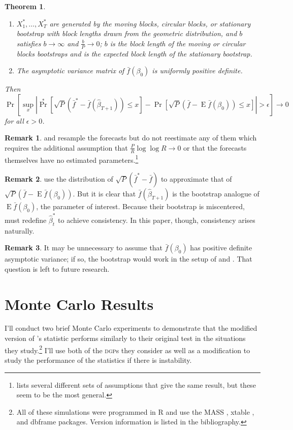 \documentclass[12pt,fleqn]{article}
\newcommand\citepos[2][]{\citeauthor{#2}'s \citeyearpar[#1]{#2}}
\newtheorem{thm}{Theorem}
\theoremstyle{definition}
\newtheorem{rem}{Remark}
\DeclareMathOperator{\E}{E}
\DeclareMathOperator{\pr}{Pr}
\newcommand{\dgp}{\textsc{dgp}}
\begin{document}
\begin{thm}
\begin{enumerate}
  \item $X_1^{*},\dots,X_T^{*}$ are generated by the moving blocks,
    circular blocks, or stationary bootstrap with block lengths drawn
    from the geometric distribution, and $b$ satisfies $b \to \infty$
    and $\frac{b}{P} \to 0$; $b$ is the block length of the moving or
    circular blocks bootstraps and is the expected block length of the
    stationary bootstrap.
  \item The asymptotic variance matrix of $\bar{f}(\beta_0)$ is
    uniformly positive definite.
  \end{enumerate}
  Then
  \begin{equation}
    \pr[\sup_x | \pr^*[\sqrt{P} (\bar{f}^* - \bar{f}(\hat{\beta}_{T+1}))
        \leq x] - \pr[\sqrt{P}( \bar{f} - \E \bar{f}(\beta_0)) \leq x] | >
      \epsilon] \to 0
  \end{equation}
  for all $\epsilon > 0$.
\end{thm}

\begin{rem}
  \citet{Whi:00} and \citet{Han:05} resample the forecasts but do not
  reestimate any of them which requires the additional assumption that
  $\tfrac{P}{R} \log \log R \to 0$ or that the forecasts themselves
  have no estimated parameters.\footnote{\citet{Whi:00} lists several
    different sets of assumptions that give the same result, but these
    seem to be the most general.}
\end{rem}

\begin{rem}
  \citet{CoS:07} use the distribution of $\sqrt{P}(\bar{f}^{*} -
  \bar{f})$ to approximate that of $\sqrt{P}(\bar{f} - \E
  \bar{f}(\beta_0))$.  But it is clear that
  $\bar{f}(\hat{\beta}_{T+1})$ is the bootstrap analogue of $\E
  \bar{f}(\beta_0)$, the parameter of interest.  Because their
  bootstrap is miscentered, \citet{CoS:07} must redefine
  $\hat{\beta}_t^{*}$ to achieve consistency.  In this paper, though,
  consistency arises naturally.
\end{rem}

\begin{rem}
  It may be unnecessary to assume that $\bar{f}(\beta_0)$ has positive
  definite asymptotic variance; if so, the bootstrap would work in the
  setup of \citet{ClM:05,ClM:01} and \citet{Mcc:07}.  That question is
  left to future research.
\end{rem}

\section{Monte Carlo Results}\label{sec:2}
I'll conduct two brief Monte Carlo experiments to demonstrate that the
modified version of \citepos{ClW:07} statistic performs similarly to
their original test in the situations they study.\footnote{All of
  these simulations were programmed in R \citep{R:2-13-0} and use the
  \textsc{MASS} \citep{VeR:02}, xtable \citep{Dah:09}, and dbframe
  \citep{Cal:10b} packages.  Version
  information is listed in the bibliography.}  I'll use both of the
\dgp s they consider as well as a modification to study the
performance of the statistics if there is instability.  
\end{document}
